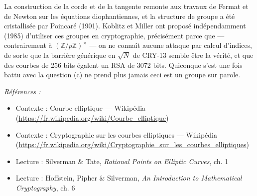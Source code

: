 \documentclass[11pt]{article}
\newenvironment{refs}{\par\small\noindent\emph{Références :}\begin{itemize}\setlength\itemsep{0pt}}{\end{itemize}\normalsize}
\begin{document}
\noindent La construction de la corde et de la tangente remonte aux travaux de
Fermat et de Newton sur les équations diophantiennes, et la structure de groupe a été
cristallisée par Poincaré (1901). Koblitz et Miller ont proposé indépendamment (1985)
d'utiliser ces groupes en cryptographie, précisément parce que --- contrairement à
$(\mathbb{Z}/p\mathbb{Z})^\times$ --- on ne connaît aucune attaque par calcul d'indices, de
sorte que la barrière générique en $\sqrt N$ de CRY-13 semble être la vérité, et que des
courbes de 256 bits égalent un RSA de 3072 bits. Quiconque s'est une fois battu avec la
question (c) ne prend plus jamais \og{} ceci est un groupe \fg{} sur parole.

\begin{refs}
\item Contexte : Courbe elliptique --- Wikipédia (\url{https://fr.wikipedia.org/wiki/Courbe_elliptique})
\item Contexte : Cryptographie sur les courbes elliptiques --- Wikipédia (\url{https://fr.wikipedia.org/wiki/Cryptographie_sur_les_courbes_elliptiques})
\item Lecture : Silverman \& Tate, \textit{Rational Points on Elliptic Curves}, ch. 1
\item Lecture : Hoffstein, Pipher \& Silverman, \textit{An Introduction to Mathematical Cryptography}, ch. 6
\end{refs}

\bigskip
\end{document}
